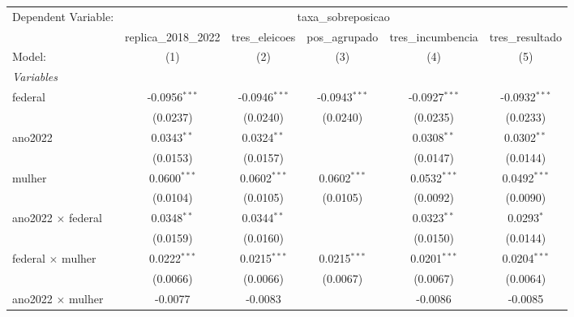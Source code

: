 
\begingroup
\centering
\begin{tabular}{lccccc}
   \tabularnewline \midrule \midrule
   Dependent Variable: & \multicolumn{5}{c}{taxa\_sobreposicao}\\
                                              & replica\_2018\_2022   & tres\_eleicoes  & pos\_agrupado   & tres\_incumbencia  & tres\_resultado \\    
   Model:                                     & (1)                   & (2)             & (3)             & (4)                & (5)\\  
   \midrule
   \emph{Variables}\\
   federal                                    & -0.0956$^{***}$       & -0.0946$^{***}$ & -0.0943$^{***}$ & -0.0927$^{***}$    & -0.0932$^{***}$\\   
                                              & (0.0237)              & (0.0240)        & (0.0240)        & (0.0235)           & (0.0233)\\   
   ano2022                                    & 0.0343$^{**}$         & 0.0324$^{**}$   &                 & 0.0308$^{**}$      & 0.0302$^{**}$\\   
                                              & (0.0153)              & (0.0157)        &                 & (0.0147)           & (0.0144)\\   
   mulher                                     & 0.0600$^{***}$        & 0.0602$^{***}$  & 0.0602$^{***}$  & 0.0532$^{***}$     & 0.0492$^{***}$\\   
                                              & (0.0104)              & (0.0105)        & (0.0105)        & (0.0092)           & (0.0090)\\   
   ano2022 $\times$ federal                   & 0.0348$^{**}$         & 0.0344$^{**}$   &                 & 0.0323$^{**}$      & 0.0293$^{*}$\\   
                                              & (0.0159)              & (0.0160)        &                 & (0.0150)           & (0.0144)\\   
   federal $\times$ mulher                    & 0.0222$^{***}$        & 0.0215$^{***}$  & 0.0215$^{***}$  & 0.0201$^{***}$     & 0.0204$^{***}$\\   
                                              & (0.0066)              & (0.0066)        & (0.0067)        & (0.0067)           & (0.0064)\\   
   ano2022 $\times$ mulher                    & -0.0077               & -0.0083         &                 & -0.0086            & -0.0085\\   

\end{tabular}
